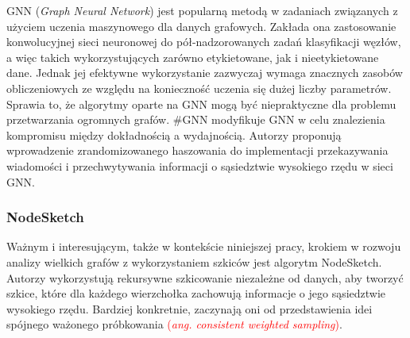         GNN\cite{4700287} (\emph{Graph Neural Network}) jest popularną metodą w zadaniach związanych z użyciem uczenia maszynowego dla danych grafowych. Zakłada ona zastosowanie konwolucyjnej sieci neuronowej do pół-nadzorowanych zadań klasyfikacji węzłów, a więc takich wykorzystujących zarówno etykietowane, jak i nieetykietowane dane. Jednak jej efektywne wykorzystanie zazwyczaj wymaga znacznych zasobów obliczeniowych ze względu na konieczność uczenia się dużej liczby parametrów. Sprawia to, że algorytmy oparte na GNN mogą być niepraktyczne dla problemu przetwarzania ogromnych grafów. \#GNN\cite{Wu_Li_Luo_Nejdl_2021} modyfikuje GNN w celu znalezienia kompromisu między dokładnością a wydajnością. Autorzy proponują wprowadzenie zrandomizowanego haszowania do implementacji przekazywania wiadomości i przechwytywania  informacji o sąsiedztwie wysokiego rzędu w sieci GNN. 
        
        \subsubsection*{NodeSketch}
            Ważnym i interesującym, także w kontekście niniejszej pracy, krokiem w rozwoju analizy wielkich grafów z wykorzystaniem szkiców jest algorytm NodeSketch\cite{Yang_Rosso_Li_Cudre-Mauroux_2019}. Autorzy wykorzystują rekursywne szkicowanie niezależne od danych, aby tworzyć szkice, które dla każdego wierzchołka zachowują informacje o jego sąsiedztwie wysokiego rzędu. Bardziej konkretnie, zaczynają oni od przedstawienia idei spójnego ważonego próbkowania \textcolor{red}{(\emph{ang. consistent weighted sampling})}. 
        
